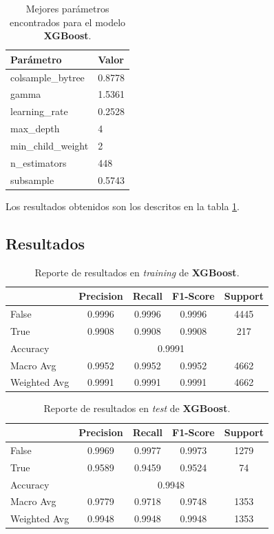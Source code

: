 \documentclass[12pt,letterpaper]{article}
\begin{document}
\begin{table}[htp]
    \centering
    \begin{tabular}{ll}
    \hline
    \textbf{Parámetro} & \textbf{Valor} \\ \hline
    colsample\_bytree & 0.8778 \\
    gamma & 1.5361 \\
    learning\_rate & 0.2528 \\
    max\_depth & 4 \\
    min\_child\_weight & 2 \\
    n\_estimators & 448 \\
    subsample & 0.5743 \\ \hline
    \end{tabular}
    \caption{Mejores parámetros encontrados para el modelo \textbf{XGBoost}.}
    \label{tab:hyper_param_xgboost}
\end{table}

Los resultados obtenidos son los descritos en la tabla \ref{tab:hyper_param_xgboost}.

\subsection{Resultados}
\begin{table}[htp]
    \centering
    \begin{tabular}{lcccc}
    \hline
    & \textbf{Precision} & \textbf{Recall} & \textbf{F1-Score} & \textbf{Support} \\ \hline
    False & 0.9996 & 0.9996 & 0.9996 & 4445 \\
    True & 0.9908 & 0.9908 & 0.9908 & 217 \\ \hline
    Accuracy & \multicolumn{4}{c}{0.9991} \\
    Macro Avg & 0.9952 & 0.9952 & 0.9952 & 4662 \\
    Weighted Avg & 0.9991 & 0.9991 & 0.9991 & 4662 \\ \hline
    \end{tabular}
    \caption{Reporte de resultados en \textit{training} de \textbf{XGBoost}.}
    \label{tab:results_training_xg}
\end{table}
    
\begin{table}[htp]
    \centering
    \begin{tabular}{lcccc}
    \hline
    & \textbf{Precision} & \textbf{Recall} & \textbf{F1-Score} & \textbf{Support} \\ \hline
    False & 0.9969 & 0.9977 & 0.9973 & 1279 \\
    True & 0.9589 & 0.9459 & 0.9524 & 74 \\ \hline
    Accuracy & \multicolumn{4}{c}{0.9948} \\
    Macro Avg & 0.9779 & 0.9718 & 0.9748 & 1353 \\
    Weighted Avg & 0.9948 & 0.9948 & 0.9948 & 1353 \\ \hline
    \end{tabular}
    \caption{Reporte de resultados en \textit{test} de \textbf{XGBoost}.}
    \label{tab:results_test_xg}
\end{table}
\end{document}
